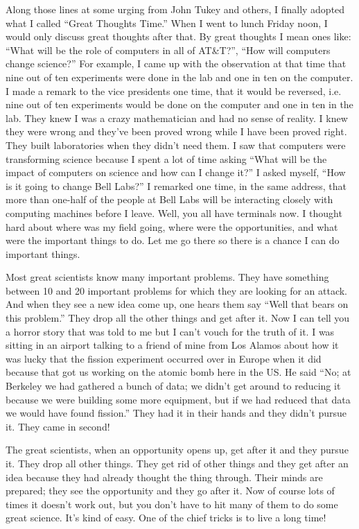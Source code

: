 \documentclass{article}
\begin{document}
Along those lines at some urging from John Tukey and others, I finally adopted what I called ``Great Thoughts Time.'' When I went to lunch Friday noon, I would only discuss great thoughts after that. By great thoughts I mean ones like: ``What will be the role of computers in all of AT\&T?'', ``How will computers change science?'' For example, I came up with the observation at that time that nine out of ten experiments were done in the lab and one in ten on the computer. I made a remark to the vice presidents one time, that it would be reversed, i.e. nine out of ten experiments would be done on the computer and one in ten in the lab. They knew I was a crazy mathematician and had no sense of reality. I knew they were wrong and they've been proved wrong while I have been proved right. They built laboratories when they didn't need them. I saw that computers were transforming science because I spent a lot of time asking ``What will be the impact of computers on science and how can I change it?'' I asked myself, ``How is it going to change Bell Labs?'' I remarked one time, in the same address, that more than one-half of the people at Bell Labs will be interacting closely with computing machines before I leave. Well, you all have terminals now. I thought hard about where was my field going, where were the opportunities, and what were the important things to do. Let me go there so there is a chance I can do important things.

Most great scientists know many important problems. They have something between 10 and 20 important problems for which they are looking for an attack. And when they see a new idea come up, one hears them say ``Well that bears on this problem.'' They drop all the other things and get after it. Now I can tell you a horror story that was told to me but I can't vouch for the truth of it. I was sitting in an airport talking to a friend of mine from Los Alamos about how it was lucky that the fission experiment occurred over in Europe when it did because that got us working on the atomic bomb here in the US. He said ``No; at Berkeley we had gathered a bunch of data; we didn't get around to reducing it because we were building some more equipment, but if we had reduced that data we would have found fission.'' They had it in their hands and they didn't pursue it. They came in second!

The great scientists, when an opportunity opens up, get after it and they pursue it. They drop all other things. They get rid of other things and they get after an idea because they had already thought the thing through. Their minds are prepared; they see the opportunity and they go after it. Now of course lots of times it doesn't work out, but you don't have to hit many of them to do some great science. It's kind of easy. One of the chief tricks is to live a long time!
\end{document}
